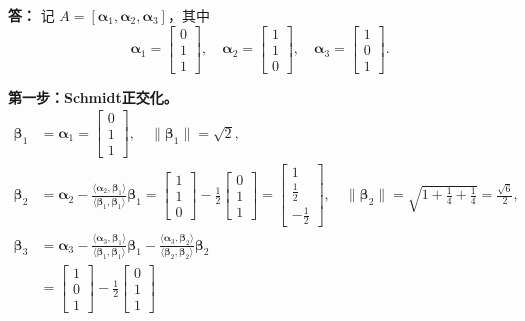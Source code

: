\documentclass{article}
\begin{document}
\noindent \textbf{答：}
记 $A=[\bm{\alpha}_1,\bm{\alpha}_2,\bm{\alpha}_3]$，其中
\[
\bm{\alpha}_1=\begin{bmatrix}0\\1\\1\end{bmatrix},\quad
\bm{\alpha}_2=\begin{bmatrix}1\\1\\0\end{bmatrix},\quad
\bm{\alpha}_3=\begin{bmatrix}1\\0\\1\end{bmatrix}.
\]

\textbf{第一步：Schmidt正交化。}
\begin{align*}
\bm{\beta}_1 &= \bm{\alpha}_1 = \begin{bmatrix}0\\1\\1\end{bmatrix},\quad \|\bm{\beta}_1\|=\sqrt{2},\\[4pt]
\bm{\beta}_2 &= \bm{\alpha}_2 - \frac{\langle\bm{\alpha}_2,\bm{\beta}_1\rangle}{\langle\bm{\beta}_1,\bm{\beta}_1\rangle}\bm{\beta}_1
= \begin{bmatrix}1\\1\\0\end{bmatrix} - \frac{1}{2}\begin{bmatrix}0\\1\\1\end{bmatrix}
= \begin{bmatrix}1\\[2pt]\frac12\\[2pt]-\frac12\end{bmatrix},\quad
\|\bm{\beta}_2\|=\sqrt{1+\frac14+\frac14}=\frac{\sqrt{6}}{2},\\[4pt]
\bm{\beta}_3 &= \bm{\alpha}_3 - \frac{\langle\bm{\alpha}_3,\bm{\beta}_1\rangle}{\langle\bm{\beta}_1,\bm{\beta}_1\rangle}\bm{\beta}_1
- \frac{\langle\bm{\alpha}_3,\bm{\beta}_2\rangle}{\langle\bm{\beta}_2,\bm{\beta}_2\rangle}\bm{\beta}_2\\
&= \begin{bmatrix}1\\0\\1\end{bmatrix} - \frac{1}{2}\begin{bmatrix}0\\1\\1\end{bmatrix}

\end{align*}
\end{document}
